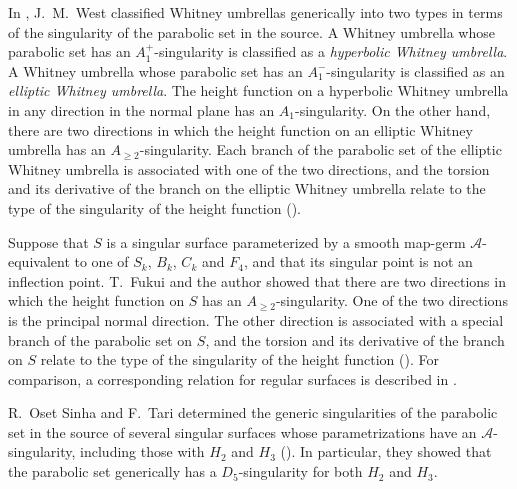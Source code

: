 \documentclass[12pt]{amsart}
\theoremstyle{plain}
\theoremstyle{definition}
\renewcommand{\geq}{\geqslant}
\begin{document}
In \cite{West1995}, J.~M.~West classified Whitney umbrellas generically into two types in terms of the singularity of the parabolic set in the source. 
A Whitney umbrella whose parabolic set has an $A_1^+$-singularity is classified as a {\it hyperbolic Whitney umbrella}.
A Whitney umbrella whose parabolic set has an $A_1^-$-singularity is classified as an {\it elliptic Whitney umbrella}.
The height function on a hyperbolic Whitney umbrella in any direction in the normal plane has an $A_1$-singularity.
On the other hand, there are two directions in which the height function on an elliptic Whitney umbrella has an $A_{\geq 2}$-singularity.
Each branch of the parabolic set of the elliptic Whitney umbrella is associated with one of the two directions, and the torsion and its derivative of the branch on the elliptic Whitney umbrella relate to the type of the singularity of the height function (\cite[Theorem~2.2]{O-ST2015}). 

Suppose that $S$ is a singular surface parameterized by a smooth map-germ $\mathcal{A}$-equivalent to one of $S_k$, $B_k$, $C_k$ and $F_4$, and that its singular point is not an inflection point. 
T.~Fukui and the author showed that there are two directions in which the height function on $S$ has an $A_{\geq 2}$-singularity.
One of the two directions is the principal normal direction.
The other direction is associated with a special branch of the parabolic set on $S$, and the torsion and its derivative of the branch on $S$ relate to the type of the singularity of the height function (\cite[Theorem 4.2]{FH2025}). 
For comparison, a corresponding relation for regular surfaces is described in \cite[Proposition 4.3]{FH2025}. 

R.~Oset Sinha and F.~Tari determined the generic singularities of the parabolic set in the source of several singular surfaces whose parametrizations have an $\mathcal{A}$-singularity, including those with $H_2$ and $H_3$ (\cite[Theorem~2.7]{O-ST2015}). 
In particular, they showed that the parabolic set generically has a $D_5$-singularity for both $H_2$ and $H_3$. 
\end{document}
